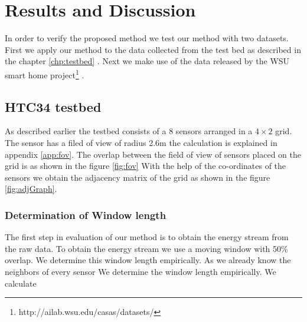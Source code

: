 \chapter{Results and Discussion}
In order to verify the proposed method we test our method with two datasets. First we apply our method to the data collected from the test bed as described in the chapter \ref{chp:testbed} . Next we make use of the data released by the WSU smart home project\footnote{http://ailab.wsu.edu/casas/datasets/} \cite{cook2009assessing}.
\section{HTC34 testbed}
As described earlier the testbed consists of a 8 sensors arranged in a $4 \times 2$ grid. The sensor has a filed of view of radius 2.6m the calculation is explained in appendix \ref{app:fov}. The overlap between the field of view of sensors placed on the grid is as shown in the figure \ref{fig:fov} With the help of the co-ordinates of the sensors we obtain the adjacency matrix of the grid as shown in the figure \ref{fig:adjGraph}.
\subsection{Determination of Window length}
The first step in evaluation of our method is to obtain the energy stream from the raw data. To obtain the energy stream we use a moving window with 50\% overlap. We determine this window length empirically. As we already know the neighbors of every sensor
We determine the window length empirically. We calculate 



